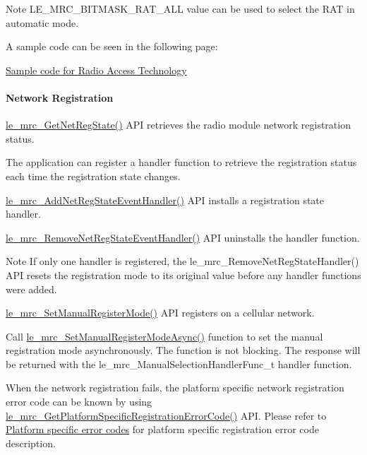 \begin{DoxyNote}{Note}
L\+E\+\_\+\+M\+R\+C\+\_\+\+B\+I\+T\+M\+A\+S\+K\+\_\+\+R\+A\+T\+\_\+\+A\+LL value can be used to select the R\+AT in automatic mode.
\end{DoxyNote}
A sample code can be seen in the following page\+:
\begin{DoxyItemize}
\item \hyperlink{c_mrcRAT}{Sample code for Radio Access Technology}
\end{DoxyItemize}\hypertarget{c_mrc_le_mrc_registration}{}\paragraph{Network Registration}\label{c_mrc_le_mrc_registration}
\hyperlink{le__mrc__interface_8h_a4f11e27862fef384c0023f5b538e543d}{le\+\_\+mrc\+\_\+\+Get\+Net\+Reg\+State()} A\+PI retrieves the radio module network registration status.

The application can register a handler function to retrieve the registration status each time the registration state changes.

\hyperlink{le__mrc__interface_8h_a929745b84719754d28f539540f71a552}{le\+\_\+mrc\+\_\+\+Add\+Net\+Reg\+State\+Event\+Handler()} A\+PI installs a registration state handler.

\hyperlink{le__mrc__interface_8h_a619adffdee5b1760348a1aa1331ac108}{le\+\_\+mrc\+\_\+\+Remove\+Net\+Reg\+State\+Event\+Handler()} A\+PI uninstalls the handler function. \begin{DoxyNote}{Note}
If only one handler is registered, the le\+\_\+mrc\+\_\+\+Remove\+Net\+Reg\+State\+Handler() A\+PI resets the registration mode to its original value before any handler functions were added.
\end{DoxyNote}
\hyperlink{le__mrc__interface_8h_ac694b8aa7543eb9f058e77a844a5c0bf}{le\+\_\+mrc\+\_\+\+Set\+Manual\+Register\+Mode()} A\+PI registers on a cellular network.

Call \hyperlink{le__mrc__interface_8h_a5b40356a56f524f5f5c9e5744687919d}{le\+\_\+mrc\+\_\+\+Set\+Manual\+Register\+Mode\+Async()} function to set the manual registration mode asynchronously. The function is not blocking. The response will be returned with the {\ttfamily le\+\_\+mrc\+\_\+\+Manual\+Selection\+Handler\+Func\+\_\+t} handler function.

When the network registration fails, the platform specific network registration error code can be known by using \hyperlink{le__mrc__interface_8h_a153247be5ea13ae2bc13ace0dd8c739c}{le\+\_\+mrc\+\_\+\+Get\+Platform\+Specific\+Registration\+Error\+Code()} A\+PI. Please refer to \hyperlink{platformConstraintsSpecificErrorCodes}{Platform specific error codes} for platform specific registration error code description.

